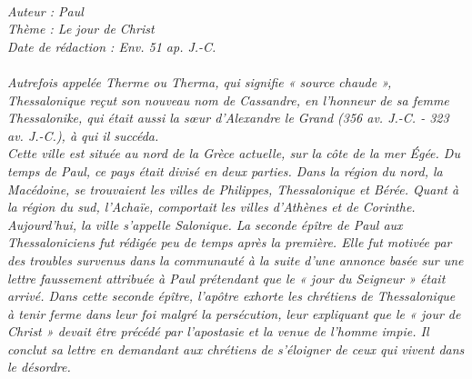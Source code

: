 \BFont
\noindent\hrulefill
{\footnotesize
\textit{
\bigskip
{\centering{}
\\Auteur : Paul
\\Thème : Le jour de Christ
\\Date de rédaction : Env. 51 ap. J.-C.\\}
}
\textit{
\\Autrefois appelée Therme ou Therma, qui signifie « source chaude », Thessalonique reçut son nouveau nom de Cassandre, en l'honneur de sa femme Thessalonike, qui était aussi la sœur d'Alexandre le Grand (356 av. J.-C. - 323 av. J.-C.), à qui il succéda.
\\Cette ville est située au nord de la Grèce actuelle, sur la côte de la mer Égée. Du temps de Paul, ce pays était divisé en deux parties. Dans la région du nord, la Macédoine, se trouvaient les villes de Philippes, Thessalonique et Bérée. Quant à la région du sud, l'Achaïe, comportait les villes d'Athènes et de Corinthe. Aujourd'hui, la ville s'appelle Salonique.
La seconde épître de Paul aux Thessaloniciens fut rédigée peu de temps après la première. Elle fut motivée par des troubles survenus dans la communauté à la suite d'une annonce basée sur une lettre faussement attribuée à Paul prétendant que le « jour du Seigneur » était arrivé. Dans cette seconde épître, l'apôtre exhorte les chrétiens de Thessalonique à tenir ferme dans leur foi malgré la persécution, leur expliquant que le « jour de Christ » devait être précédé par l'apostasie et la venue de l'homme impie. Il conclut sa lettre en demandant aux chrétiens de s'éloigner de ceux qui vivent dans le désordre.\bigskip
}
}
\par\nobreak\noindent\hrulefill
